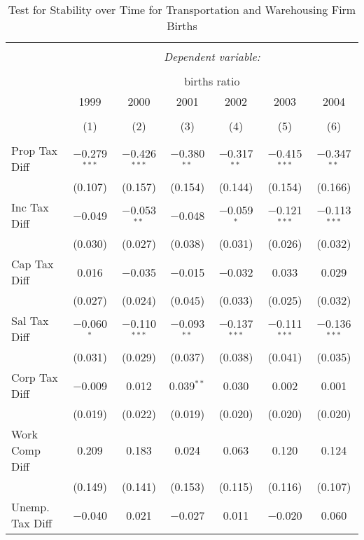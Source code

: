 
\begin{table}[!htbp] \centering 
  \caption{Test for Stability over Time for  Transportation and Warehousing Firm Births} 
  \label{48-49year} 
\small 
\begin{tabular}{@{\extracolsep{5pt}}lcccccc} 
\\[-1.8ex]\hline 
\hline \\[-1.8ex] 
 & \multicolumn{6}{c}{\textit{Dependent variable:}} \\ 
\cline{2-7} 
\\[-1.8ex] & \multicolumn{6}{c}{births ratio} \\ 
 & 1999 & 2000 & 2001 & 2002 & 2003 & 2004 \\ 
\\[-1.8ex] & (1) & (2) & (3) & (4) & (5) & (6)\\ 
\hline \\[-1.8ex] 
 Prop Tax Diff & $-$0.279$^{***}$ & $-$0.426$^{***}$ & $-$0.380$^{**}$ & $-$0.317$^{**}$ & $-$0.415$^{***}$ & $-$0.347$^{**}$ \\ 
  & (0.107) & (0.157) & (0.154) & (0.144) & (0.154) & (0.166) \\ 
  Inc Tax Diff & $-$0.049 & $-$0.053$^{**}$ & $-$0.048 & $-$0.059$^{*}$ & $-$0.121$^{***}$ & $-$0.113$^{***}$ \\ 
  & (0.030) & (0.027) & (0.038) & (0.031) & (0.026) & (0.032) \\ 
  Cap Tax Diff & 0.016 & $-$0.035 & $-$0.015 & $-$0.032 & 0.033 & 0.029 \\ 
  & (0.027) & (0.024) & (0.045) & (0.033) & (0.025) & (0.032) \\ 
  Sal Tax Diff & $-$0.060$^{*}$ & $-$0.110$^{***}$ & $-$0.093$^{**}$ & $-$0.137$^{***}$ & $-$0.111$^{***}$ & $-$0.136$^{***}$ \\ 
  & (0.031) & (0.029) & (0.037) & (0.038) & (0.041) & (0.035) \\ 
  Corp Tax Diff & $-$0.009 & 0.012 & 0.039$^{**}$ & 0.030 & 0.002 & 0.001 \\ 
  & (0.019) & (0.022) & (0.019) & (0.020) & (0.020) & (0.020) \\ 
  Work Comp Diff & 0.209 & 0.183 & 0.024 & 0.063 & 0.120 & 0.124 \\ 
  & (0.149) & (0.141) & (0.153) & (0.115) & (0.116) & (0.107) \\ 
  Unemp. Tax Diff & $-$0.040 & 0.021 & $-$0.027 & 0.011 & $-$0.020 & 0.060 \\ 

\end{tabular}
\end{table}
